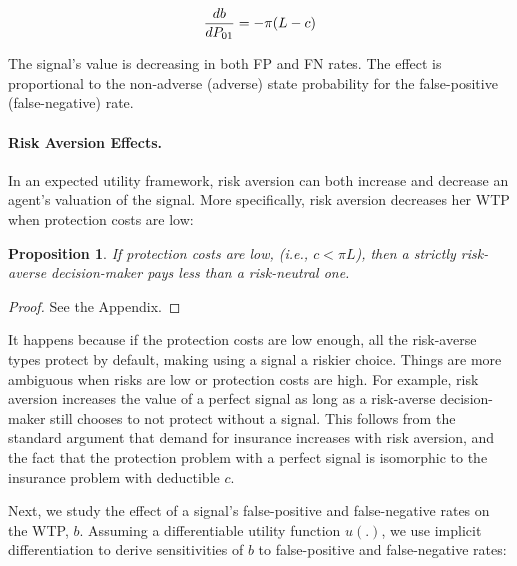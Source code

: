 \documentclass[12pt,a4paper]{article}
\newtheorem{theorem}{Proposition}
\begin{document}
\begin{equation}\label{eq:dWTP_dFN}
{db\over dP_{01}}=-\pi(L-c)
\end{equation}
\vspace{10pt}

The signal's value is decreasing in both FP and FN rates. The effect is proportional to the non-adverse (adverse) state probability for the false-positive (false-negative) rate.

\paragraph{Risk Aversion Effects.} In an expected utility framework, risk aversion can both increase and decrease an agent's valuation of the signal. More specifically, risk aversion decreases her WTP when protection costs are low: 

\begin{theorem}
 If protection costs are low, (i.e., $c<\pi L$), then a strictly risk-averse decision-maker pays less than a risk-neutral one.
\end{theorem} 
\begin{proof}
See the Appendix.
\end{proof}

It happens because if the protection costs are low enough, all the risk-averse types protect by default, making using a signal a riskier choice. Things are more ambiguous when risks are low or protection costs are high. For example, risk aversion increases the value of a perfect signal as long as a risk-averse decision-maker still chooses to not protect without a signal. This follows from the standard argument that demand for insurance increases with risk aversion, and the fact that the protection problem with a perfect signal is isomorphic to the insurance problem with deductible $c$. 

Next, we study the effect of a signal's false-positive and false-negative rates on the WTP, $b$. Assuming a differentiable utility function $u(.)$, we use implicit differentiation to derive sensitivities of $b$ to false-positive and false-negative rates:
\end{document}
